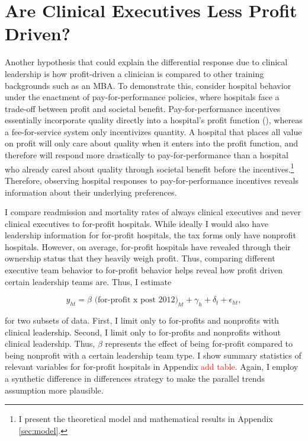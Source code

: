 \documentclass[12pt]{article}
\begin{document}
    


    \section{Are Clinical Executives Less Profit Driven?}\label{sec:forprofit}

    Another hypothesis that could explain the differential response due to clinical leadership is how profit-driven a clinician is compared to other training backgrounds such as an MBA. To demonstrate this, consider hospital behavior under the enactment of pay-for-performance policies, where hospitals face a trade-off between profit and societal benefit. Pay-for-performance incentives essentially incorporate quality directly into a hospital's profit function (\cite{dranove2011health}), whereas a fee-for-service system only incentivizes quantity. A hospital that places all value on profit will only care about quality when it enters into the profit function, and therefore will respond more drastically to pay-for-performance than a hospital who already cared about quality through societal benefit before the incentives.\footnote{I present the theoretical model and mathematical results in Appendix \ref{sec:model}.} Therefore, observing hospital responses to pay-for-performance incentives reveals information about their underlying preferences.  

    I compare readmission and mortality rates of always clinical executives and never clinical executives to for-profit hospitals. While ideally I would also have leadership information for for-profit hospitals, the tax forms only have nonprofit hospitals. However, on average, for-profit hospitals have revealed through their ownership status that they heavily weigh profit. Thus, comparing different executive team behavior to for-profit behavior helps reveal how profit driven certain leadership teams are. Thus, I estimate

    \begin{equation}
    \label{eq:forprofit}
    y_{ht} = \beta \text{ (for-profit x post 2012)}_{ht} + \gamma_{h} + \delta_t + \epsilon_{ht},
    \end{equation}

    \noindent for two subsets of data. First, I limit only to for-profits and nonprofits with clinical leadership. Second, I limit only to for-profits and nonprofits without clinical leadership. Thus, $\beta$ represents the effect of being for-profit compared to being nonprofit with a certain leadership team type. I show summary statistics of relevant variables for for-profit hospitals in Appendix \textcolor{red}{add table}. Again, I employ a synthetic difference in differences strategy to make the parallel trends assumption more plausible.
\end{document}
